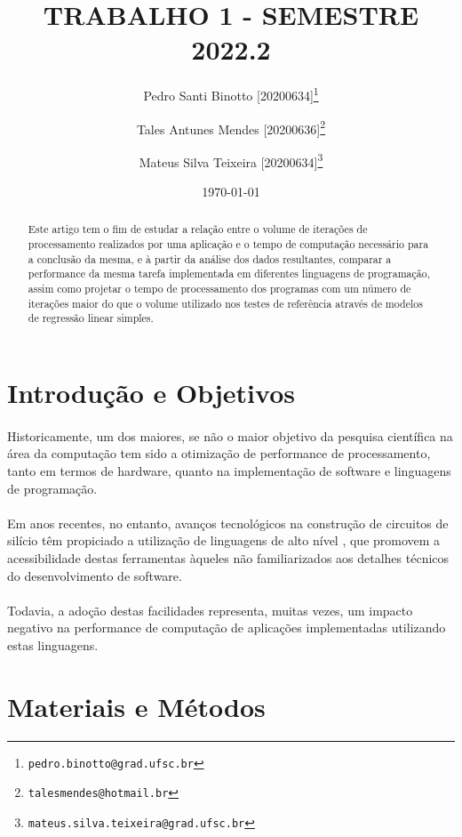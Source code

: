 \documentclass[11pt]{article}
\title{TRABALHO 1 - SEMESTRE 2022.2}
\author[1]{Pedro Santi Binotto [20200634]\thanks{\texttt{pedro.binotto@grad.ufsc.br}}}
\author[1]{Tales Antunes Mendes [20200636]\thanks{\texttt{talesmendes@hotmail.br}}}
\author[1]{Mateus Silva Teixeira [20200634]\thanks{\texttt{mateus.silva.teixeira@grad.ufsc.br}}}
\date{\today}
\affil[1]{Departamento de Informática e Estatística, Universidade Federal de Santa Catarina}
\begin{document}
\maketitle

\begin{abstract}
Este artigo tem o fim de estudar a relação entre o volume de iterações de
processamento realizados por uma aplicação e o tempo de computação necessário
para a conclusão da mesma, e à partir da análise dos dados resultantes,
comparar a performance da mesma tarefa implementada em diferentes linguagens de
programação, assim como projetar o tempo de processamento dos programas com um
número de iterações maior do que o volume utilizado nos testes de referência
através de modelos de regressão linear simples.
\end{abstract}

\newpage
\section{Introdução e Objetivos}
\paragraph{}
Historicamente, um dos maiores, se não o maior objetivo da pesquisa científica
na área da computação tem sido a otimização de performance de processamento,
tanto em termos de hardware\cite{schaller1997moore}, quanto na implementação de
software e linguagens de programação.

\paragraph{}
Em anos recentes, no entanto, avanços tecnológicos na construção de circuitos
de silício têm propiciado a utilização de linguagens de alto nível
\cite{srinath2017python}, que promovem a acessibilidade destas ferramentas
àqueles não familiarizados aos detalhes técnicos do desenvolvimento de software.

\paragraph{}
Todavia, a adoção destas facilidades representa, muitas vezes, um impacto
negativo na performance de computação de aplicações implementadas utilizando
estas linguagens\cite{prechelt2000empirical}.

\newpage
\section{Materiais e Métodos}
\end{document}
